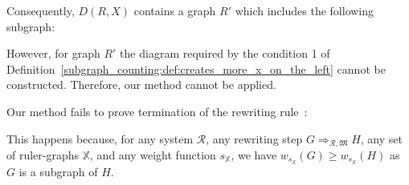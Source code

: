 \begin{example}[Limitation]
  Consequently, $D(R,X)$ contains a graph $R'$ which includes the following subgraph:
    \begin{center}
  \end{center}
  However, for graph $R'$ the diagram required by the condition 1 of Definition~\ref{subgraph_counting:def:creates_more_x_on_the_left} cannot be constructed. Therefore, our method cannot be applied.
\end{example}

\begin{example}[Limitation]
    \label{ex:endrullis:d3:limitation}  
    Our method fails to prove termination of the rewriting rule~\cite[Example D.3]{endrullis2024generalized_arxiv_v2}:
    \begin{center}
  \end{center}

    This happens because, for any system $\mathcal{R}$, any rewriting step $G \mathop{\Rightarrow}_{\mathcal{R},\mathfrak{M}} H$, any set of ruler-graphs $\mathbb{X}$, and any weight function $s_\mathbb{X}$, we have $w_{s_\mathbb{X}}(G) \mathop{\geq} w_{s_\mathbb{X}}(H)$ as $G$ is a subgraph of $H$.
  \end{example} 

